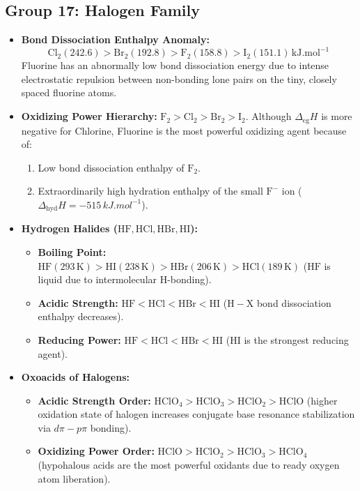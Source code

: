 \documentclass[10pt,a4paper]{article}
\begin{document}
\subsection{Group 17: Halogen Family}
\begin{itemize}
  \item \textbf{Bond Dissociation Enthalpy Anomaly:}
  \begin{equation}
    \mathbf{\mathrm{Cl_2 (242.6) > Br_2 (192.8) > F_2 (158.8) > I_2 (151.1)\,\si{kJ.mol^{-1}}}}
  \end{equation}
  Fluorine has an abnormally low bond dissociation energy due to intense electrostatic repulsion between non-bonding lone pairs on the tiny, closely spaced fluorine atoms.
  \item \textbf{Oxidizing Power Hierarchy:} $\mathbf{\mathrm{F_2 > Cl_2 > Br_2 > I_2}}$.
  Although $\Delta_{\text{eg}} H$ is more negative for Chlorine, Fluorine is the most powerful oxidizing agent because of:
  \begin{enumerate}
    \item Low bond dissociation enthalpy of $\mathrm{F_2}$.
    \item Extraordinarily high hydration enthalpy of the small $\mathrm{F^-}$ ion ($\Delta_{\text{hyd}} H = -515\,\si{kJ.mol^{-1}}$).
  \end{enumerate}
  \item \textbf{Hydrogen Halides ($\mathrm{HF, HCl, HBr, HI}$):}
  \begin{itemize}
    \item \textbf{Boiling Point:} $\mathbf{\mathrm{HF (293\,K) > HI (238\,K) > HBr (206\,K) > HCl (189\,K)}}$ ($\mathrm{HF}$ is liquid due to intermolecular H-bonding).
    \item \textbf{Acidic Strength:} $\mathrm{HF < HCl < HBr < HI}$ ($\mathrm{H-X}$ bond dissociation enthalpy decreases).
    \item \textbf{Reducing Power:} $\mathrm{HF < HCl < HBr < HI}$ ($\mathrm{HI}$ is the strongest reducing agent).
  \end{itemize}
  \item \textbf{Oxoacids of Halogens:}
  \begin{itemize}
    \item \textbf{Acidic Strength Order:} $\mathbf{\mathrm{HClO_4 > HClO_3 > HClO_2 > HClO}}$ (higher oxidation state of halogen increases conjugate base resonance stabilization via $d\pi-p\pi$ bonding).
    \item \textbf{Oxidizing Power Order:} $\mathbf{\mathrm{HClO > HClO_2 > HClO_3 > HClO_4}}$ (hypohalous acids are the most powerful oxidants due to ready oxygen atom liberation).
  \end{itemize}
\end{itemize}
\end{document}
